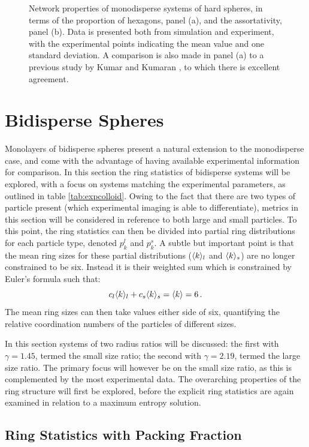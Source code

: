\begin{figure}[bt]
     \caption{Network properties of monodisperse systems of \qtd{} hard spheres, in terms of the proportion of hexagons, panel (a), and the assortativity, panel (b). Data is presented both from simulation and experiment, with the experimental points indicating the mean value and one standard deviation. A comparison is also made in panel (a) to a previous study by Kumar and Kumaran \cite{Kumar2005}, to which there is excellent agreement.}
     \label{fig:mono}
\end{figure}


\section{Bidisperse Spheres}
\label{s:bidisperse}

Monolayers of bidisperse spheres present a natural extension to the monodisperse case, and come with the advantage of having available experimental information for comparison.
In this section the ring statistics of bidisperse systems will be explored, with a focus on systems matching the experimental parameters, as outlined in table \ref{tab:expcolloid}.
Owing to the fact that there are two types of particle present (which experimental imaging is able to differentiate), metrics in this section will be considered in reference to both large and small particles.
To this point, the ring statistics can then be divided into partial ring distributions for each particle type, denoted $p_k^l$ and $p_k^s$.
A subtle but important point is that the mean ring sizes for these partial distributions ($\langle k \rangle_l$ and $\langle k \rangle_s$) are no longer constrained to be six.
Instead it is their weighted sum which is constrained by Euler's formula such that:
\begin{equation}
	c_l\langle k \rangle_l+c_s\langle k \rangle_s = \langle k \rangle = 6\,.
\end{equation}
The mean ring sizes can then take values either side of six, quantifying the relative coordination numbers of the particles of different sizes.

In this section systems of two radius ratios will be discussed: the first with $\gamma=1.45$, termed the small size ratio; the second with $\gamma=2.19$, termed the large size ratio.
The primary focus will however be on the small size ratio, as this is complemented by the most experimental data.
The overarching properties of the ring structure will first be explored, before the explicit ring statistics are again examined in relation to a maximum entropy solution.


\subsection{Ring Statistics with Packing Fraction}

